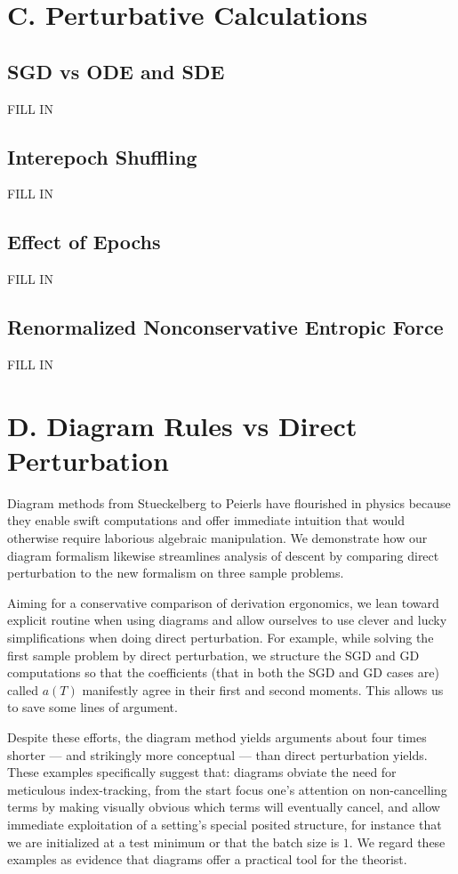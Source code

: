 \documentclass{article}
\begin{document}
\section*{C. Perturbative Calculations}

    \subsection*{SGD vs ODE and SDE}
        {\color{moor} FILL IN}
    \subsection*{Interepoch Shuffling}
        {\color{moor} FILL IN}
    \subsection*{Effect of Epochs}
        {\color{moor} FILL IN}
    \subsection*{Renormalized Nonconservative Entropic Force}
        {\color{moor} FILL IN}

\section*{D. Diagram Rules vs Direct Perturbation} \label{sect:compare}
    Diagram methods from Stueckelberg to Peierls have flourished in physics
    because they enable swift computations and offer immediate intuition that
    would otherwise require laborious algebraic manipulation.  We demonstrate
    how our diagram formalism likewise streamlines analysis of descent by
    comparing direct perturbation to the new formalism on three sample
    problems.

    Aiming for a conservative comparison of derivation ergonomics, we lean
    toward explicit routine when using diagrams and allow ourselves to use
    clever and lucky simplifications when doing direct perturbation.  For
    example, while solving the first sample problem by direct perturbation,
    we structure the SGD and GD computations so that the coefficients (that in
    both the SGD and GD cases are) called $a(T)$ manifestly agree in their
    first and second moments.  This allows us to save some lines of argument.

    Despite these efforts, the diagram method yields arguments about four times
    shorter --- and strikingly more conceptual --- than direct perturbation
    yields.  These examples specifically suggest that: diagrams obviate the
    need for meticulous index-tracking, from the start focus one's attention on
    non-cancelling terms by making visually obvious which terms will eventually
    cancel, and allow immediate exploitation of a setting's special posited
    structure, for instance that we are initialized at a test minimum or that
    the batch size is $1$.  We regard these examples as evidence that diagrams
    offer a practical tool for the theorist.
\end{document}
